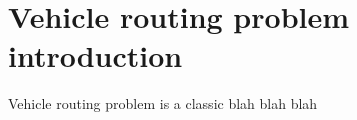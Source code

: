 \chapter{Vehicle routing problem introduction}
\label{chapter:background} 

Vehicle routing problem is a classic blah blah blah
